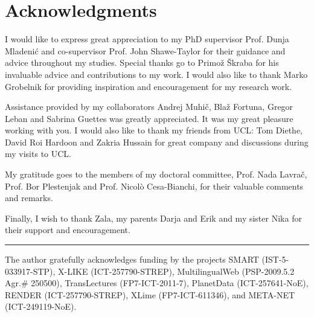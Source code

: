%
\chapter*{Acknowledgments}

I would like to express great appreciation to my PhD supervisor Prof. Dunja
Mladenić and co-supervisor Prof. John Shawe-Taylor for their guidance and advice
throughout my studies. Special thanks go to Primož Škraba for his invaluable advice and contributions to my work.
I would also like to thank Marko Grobelnik for providing inspiration and encouragement for my research work.

Assistance provided by my collaborators Andrej Muhič, Blaž Fortuna, Gregor Leban
and Sabrina Guettes was greatly appreciated. It was my great pleasure working with you.
I would also like to thank my friends from UCL: Tom Diethe, David Roi Hardoon and Zakria Hussain
for great company and discussions during my visits to UCL.

My gratitude goes to the members of my doctoral committee, Prof. Nada Lavrač, Prof.
Bor Plestenjak and Prof. Nicolò Cesa-Bianchi, for their valuable comments and
remarks.

Finally, I wish to thank Zala, my parents Darja and Erik and my sister Nika
for their support and encouragement.

\rule{0.5\textwidth}{.4pt}

The author gratefully acknowledges funding by the projects
SMART (IST-5-033917-STP), X-LIKE (ICT-257790-STREP), MultilingualWeb (PSP-2009.5.2 Agr.\# 250500),
TransLectures (FP7-ICT-2011-7), PlanetData (ICT-257641-NoE), RENDER (ICT-257790-STREP), XLime (FP7-ICT-611346),
and META-NET (ICT-249119-NoE). 